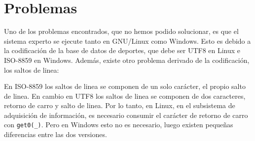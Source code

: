 \chapter{Problemas}
Uno de los problemas encontrados, que no hemos podido solucionar, es que el sistema experto se ejecute tanto en GNU/Linux como Windows. Esto es debido a la codificación de la base de datos de deportes, que debe ser UTF8 en Linux e ISO-8859 en Windows. Además, existe otro problema derivado de la codificación, los saltos de linea:

En ISO-8859 los saltos de linea se componen de un solo carácter, el propio salto de linea. En cambio en UTF8 los saltos de linea se componen de dos caracteres, retorno de carro y salto de linea. Por lo tanto, en Linux, en el subsistema de adquisición de información, es necesario consumir el carácter de retorno de carro con \texttt{get0(\_)}. Pero en Windows esto no es necesario, luego existen pequeñas diferencias entre las dos versiones.
